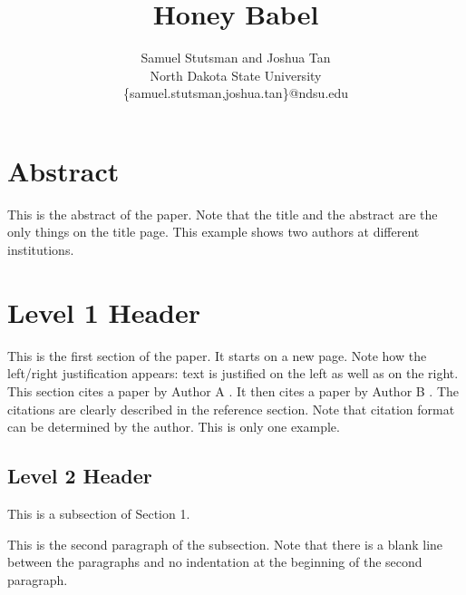 \documentclass[12pt]{article}
\begin{document}
\pagestyle{plain}

\title{Honey Babel}

\author{
Samuel Stutsman and Joshua Tan\\
North Dakota State University\\
\{samuel.stutsman,joshua.tan\}@ndsu.edu
}
\date{} 

\maketitle
\thispagestyle{empty}

\section*{\centering Abstract}

This is the abstract of the paper.  Note that the title and the abstract are the only things on the title page.  This example shows two authors at different institutions.

\newpage
\setcounter{page}{1}

\section{Level 1 Header}

This is the first section of the paper.  It starts on a new page.  Note how the left/right justification appears: text is justified on the left as well as on the right.  This section cites a paper by Author A \cite{Juels:2013:HMP:2508859.2516671}.  It then cites a paper by Author B \cite{Mazurek:2013:MPG:2508859.2516726}.  The citations are clearly described in the reference section.  Note that citation format can be determined by the author.  This is only one example.

\subsection{Level 2 Header}

This is a subsection of Section 1.   %

This is the second paragraph of the subsection.  Note that there is a blank line between the paragraphs and
no indentation at the beginning of the second paragraph. 
 
\end{document}
